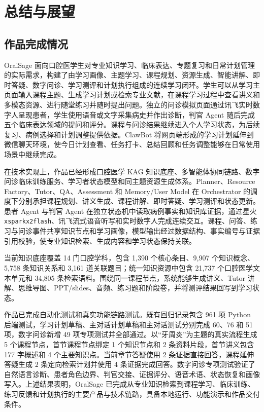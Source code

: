 \chapter{总结与展望}
\label{sec:conclusion}

\section{作品完成情况}

OralSage 面向口腔医学生对专业知识学习、临床表达、专题复习和日常计划管理的实际需求，构建了由学习画像、主题学习、课程规划、资源生成、智能讲解、即时答疑、数字问诊、学习测评和计划执行组成的连续学习闭环。学生可以从学习主页面输入课程主题、生成学习计划或检索专业文献，在课程学习过程中查看讲义和多模态资源、进行随堂练习并随时提出问题。独立的问诊模拟页面通过讯飞实时数字人呈现患者，学生使用语音或文字采集病史并作出诊断，判官 Agent 随后完成五个临床表达领域的提问和评分。课程与问诊结果继续进入个人学习状态，为后续复习、病例选择和计划调整提供依据。ClawBot 将网页端形成的学习计划延伸到微信聊天环境，使今日计划查看、任务打卡、总结回顾和任务调整能够在日常使用场景中继续完成。

在技术实现上，作品已经形成口腔医学 KAG 知识底座、多智能体协同链路、数字问诊临床训练服务、学习者状态模型和同主题资源生成体系。Planner、Resource Factory、Tutor、QA、Assessment 和 Memory/User Model 在 Orchestrator 的调度下分别承担课程规划、讲义生成、课程讲解、即时答疑、学习测评和状态更新。患者 Agent 与判官 Agent 在独立状态机中读取病例事实和知识库证据，通过星火 \texttt{xsparkx2flash}、讯飞流式语音听写和实时数字人完成连续交互。课程、问答、练习与问诊事件共享知识节点和学习画像，模型输出经过数据结构、事实编号与证据引用校验，使专业知识检索、生成内容和学习状态保持关联。

当前知识底座覆盖 14 门口腔学科，包含 1,390 个核心条目、9,907 个知识概念、5,758 条知识关系和 3,161 道关联题目；统一知识资源中包含 21,737 个口腔医学文本单元和 34,805 条检索语料。围绕同一课程节点，系统能够生成讲义、Tutor 讲解、思维导图、PPT/slides、音频、练习题和阶段卷，并将测评结果回写到学习状态。

作品已完成自动化测试和真实功能链路测试。既有回归记录包含 961 项 Python 后端测试，学习计划草稿、主对话计划草稿和主对话测试分别完成 60、76 和 51 项，数字问诊新增 49 项专项测试并全部通过。以“牙周炎”为主题的真实流程生成 5 个课程节点，首节课程节点绑定 1 个知识节点和 2 条资料片段，首节讲义包含 177 字概述和 4 个主要知识点。当前章节答疑使用 2 条证据直接回答，课程延伸答疑生成 2 条定向检索计划并使用 4 条证据完成回答。数字问诊专项测试验证了自然语言诊断、患者角色边界、判官交接、证据评分、语音术语、状态恢复和画像写入。上述结果表明，OralSage 已完成从专业知识检索到课程学习、临床训练、练习反馈和计划执行的主要产品与技术链路，具备本地运行、功能演示和作品交付条件。

